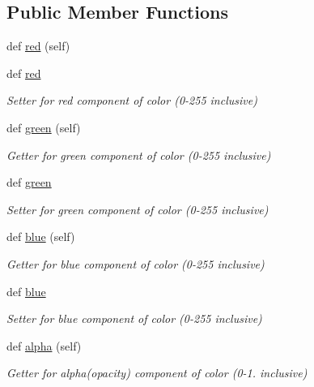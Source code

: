 \subsection*{Public Member Functions}
\begin{DoxyCompactItemize}
\item 
def \mbox{\hyperlink{classbridges_1_1color_1_1_color_ab2b29fe67b6ad8dddde7ff8eddedcce0}{red}} (self)
\item 
def \mbox{\hyperlink{classbridges_1_1color_1_1_color_a39719b281c9095293a1445c6deb7792b}{red}}
\begin{DoxyCompactList}\small\item\em Setter for red component of color (0-\/255 inclusive) \end{DoxyCompactList}\item 
def \mbox{\hyperlink{classbridges_1_1color_1_1_color_a86ec858a55491936054abcea865498ec}{green}} (self)
\begin{DoxyCompactList}\small\item\em Getter for green component of color (0-\/255 inclusive) \end{DoxyCompactList}\item 
def \mbox{\hyperlink{classbridges_1_1color_1_1_color_a4c0826514c64b53910270336d357ad80}{green}}
\begin{DoxyCompactList}\small\item\em Setter for green component of color (0-\/255 inclusive) \end{DoxyCompactList}\item 
def \mbox{\hyperlink{classbridges_1_1color_1_1_color_a14f94eb29dcabf578a1932c5477e12f3}{blue}} (self)
\begin{DoxyCompactList}\small\item\em Getter for blue component of color (0-\/255 inclusive) \end{DoxyCompactList}\item 
def \mbox{\hyperlink{classbridges_1_1color_1_1_color_a0673063270c8a522b086a916f09dd1f5}{blue}}
\begin{DoxyCompactList}\small\item\em Setter for blue component of color (0-\/255 inclusive) \end{DoxyCompactList}\item 
def \mbox{\hyperlink{classbridges_1_1color_1_1_color_ae5dc631fcda27156867b21109620ae21}{alpha}} (self)
\begin{DoxyCompactList}\small\item\em Getter for alpha(opacity) component of color (0-\/1. inclusive) \end{DoxyCompactList}\item 

\end{DoxyCompactItemize}
